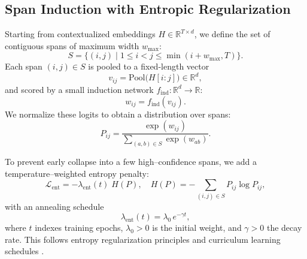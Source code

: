 \subsection{Span Induction with Entropic Regularization}
\label{sec:span-induction}

Starting from contextualized embeddings \(H\in\mathbb{R}^{T\times d}\), we define the set of contiguous spans of maximum width \(w_{\max}\):
\begin{equation}
	S = \bigl\{(i,j)\;\big|\;1\le i<j\le \min(i+w_{\max},T)\bigr\}.
	\label{eq:contiguous_span_set}
\end{equation}
Each span \((i,j)\in S\) is pooled to a fixed-length vector
\[
v_{ij} = \mathrm{Pool}\bigl(H[i:j]\bigr)\in\mathbb{R}^d,
\]
and scored by a small induction network \(f_{\mathrm{ind}}:\mathbb{R}^d\to\mathbb{R}\):
\[
w_{ij} = f_{\mathrm{ind}}(v_{ij}).
\]
We normalize these logits to obtain a distribution over spans:
\begin{equation}
	P_{ij}
	= \frac{\exp(w_{ij})}
	{\sum_{(a,b)\in S}\exp(w_{ab})}.
	\label{eq:span_softmax}
\end{equation}

To prevent early collapse into a few high–confidence spans, we add a temperature–weighted entropy penalty:
\begin{equation}
	\mathcal{L}_{\mathrm{ent}}
	= -\lambda_{\mathrm{ent}}(t)\;H(P),
	\quad
	H(P) = -\sum_{(i,j)\in S}P_{ij}\log P_{ij},
	\label{eq:entropy_term}
\end{equation}
with an annealing schedule
\begin{equation}
	\lambda_{\mathrm{ent}}(t)
	= \lambda_0\,e^{-\gamma t},
	\label{eq:entropy_decay}
\end{equation}
where \(t\) indexes training epochs, \(\lambda_0>0\) is the initial weight, and \(\gamma>0\) the decay rate.  This follows entropy regularization principles \cite{grandvalet2005semi,pereyra2017regularizing} and curriculum learning schedules \cite{bengio2009curriculum,kreutzer2021distilling}.

